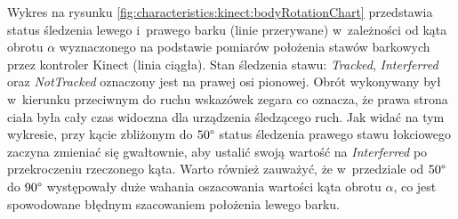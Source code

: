 Wykres na rysunku \ref{fig:characteristics:kinect:bodyRotationChart} przedstawia status śledzenia lewego i~prawego barku (linie przerywane) w~zależności od kąta obrotu $\alpha$ wyznaczonego na podstawie pomiarów położenia stawów barkowych przez kontroler Kinect (linia ciągła). Stan śledzenia stawu: \emph{Tracked}, \emph{Interferred} oraz \emph{NotTracked} oznaczony jest na prawej osi pionowej. Obrót wykonywany był w~kierunku przeciwnym do ruchu wskazówek zegara co oznacza, że prawa strona ciała była cały czas widoczna dla urządzenia śledzącego ruch. Jak widać na tym wykresie, przy kącie zbliżonym do $50\degree$ status śledzenia prawego stawu łokciowego zaczyna zmieniać się gwałtownie, aby ustalić swoją wartość na \emph{Interferred} po przekroczeniu rzeczonego kąta. Warto również zauważyć, że w~przedziale od $50\degree$ do $90\degree$ występowały duże wahania oszacowania wartości kąta obrotu $\alpha$, co jest spowodowane błędnym szacowaniem położenia lewego barku.

